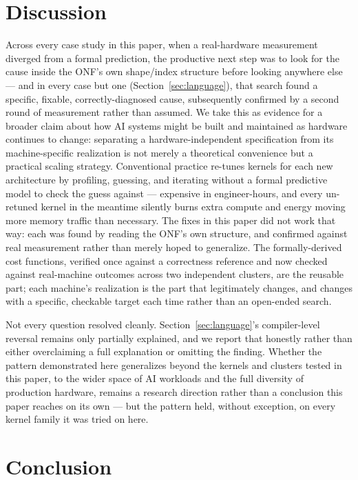 \documentclass[sigconf,review,anonymous]{acmart}
\begin{document}
\section{Discussion}
\label{sec:discussion}

Across every case study in this paper, when a real-hardware measurement
diverged from a formal prediction, the productive next step was to
look for the cause inside the ONF's own shape/index structure before
looking anywhere else --- and in every case but one
(Section~\ref{sec:language}), that search found a specific, fixable,
correctly-diagnosed cause, subsequently confirmed by a second round of
measurement rather than assumed. We take this as evidence for a
broader claim about how AI systems might be built and maintained as
hardware continues to change: separating a hardware-independent
specification from its machine-specific realization is not merely a
theoretical convenience but a practical scaling strategy. Conventional
practice re-tunes kernels for each new architecture by profiling,
guessing, and iterating without a formal predictive model to check the
guess against --- expensive in engineer-hours, and every un-retuned
kernel in the meantime silently burns extra compute and energy moving
more memory traffic than necessary. The fixes in this paper did not
work that way: each was found by reading the ONF's own structure, and
confirmed against real measurement rather than merely hoped to
generalize. The formally-derived cost functions, verified once against
a correctness reference and now checked against real-machine outcomes
across two independent clusters, are the reusable part; each machine's
realization is the part that legitimately changes, and changes with a
specific, checkable target each time rather than an open-ended search.

Not every question resolved cleanly. Section~\ref{sec:language}'s
compiler-level reversal remains only partially explained, and we report
that honestly rather than either overclaiming a full explanation or
omitting the finding. Whether the pattern demonstrated here generalizes
beyond the kernels and clusters tested in this paper, to the wider
space of AI workloads and the full diversity of production hardware,
remains a research direction rather than a conclusion this paper
reaches on its own --- but the pattern held, without exception, on
every kernel family it was tried on here.

\section{Conclusion}
\end{document}
